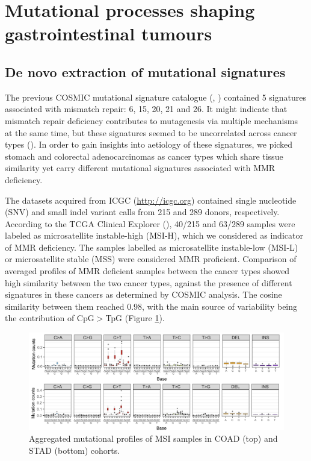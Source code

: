 
\section{Mutational processes shaping gastrointestinal tumours}

\subsection{De novo extraction of mutational signatures}

The previous COSMIC mutational signature catalogue (\cite{Alexandrov2015-clock}, \cite{Forbes2015-gf}) contained 5 signatures
associated with mismatch repair: 6, 15, 20, 21 and 26. It might indicate that mismatch repair deficiency
contributes to mutagenesis via multiple mechanisms at the same time, but these signatures seemed to be
uncorrelated across cancer types (\cite{Alexandrov2015-clock}). In order to gain insights into aetiology of these
signatures, we
picked stomach and colorectal adenocarcinomas as cancer types which share tissue similarity yet carry
different mutational signatures associated with MMR deficiency.

The datasets acquired from ICGC (\url{http://icgc.org}) contained single nucleotide (SNV) and 
small indel variant calls from 215 and 289 donors, respectively. 
According to the TCGA Clinical Explorer (\cite{Lee2015-hf}), 40/215 and 63/289 samples were 
labeled as microsatellite instable-high (MSI-H), which we considered as indicator of MMR deficiency. 
The samples labelled as microsatellite instable-low (MSI-L) or 
microsatellite stable (MSS) were considered MMR proficient. 
Comparison of averaged profiles of MMR deficient samples between
the cancer types showed high similarity between the two cancer types, against the presence
of different signatures in these cancers as determined by COSMIC analysis. The cosine similarity
between them reached 0.98, with the main source of variability being the contribution of 
CpG$>$TpG (Figure \ref{STAD_COAD_MSI}). 

\begin{figure}
  \centering
  \centerline{\includegraphics[width=1\textwidth]{figures/STAD_COAD_MSI_samples.png}}
  \caption{Aggregated mutational profiles of MSI samples in COAD (top) and STAD (bottom) cohorts.}
  \label{STAD_COAD_MSI}
\end{figure}

